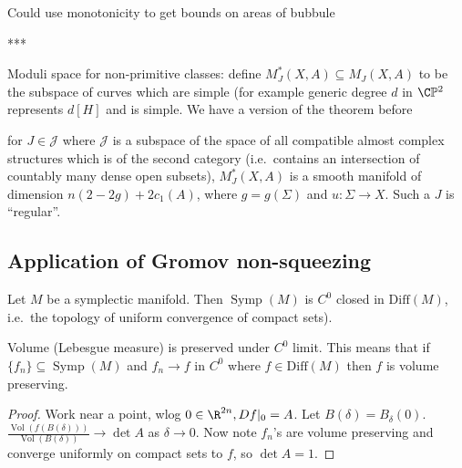 \documentclass[a4paper]{article}
\renewcommand*{\P}{\mathbb{P}}
\DeclareMathOperator{\Vol}{Vol} %
\DeclareMathOperator{\Symp}{Symp}
\begin{document}
Could use monotonicity to get bounds on areas of bubbule

***

Moduli space for non-primitive classes: define \(M_J^*(X, A) \subseteq M_J(X, A)\) to be the subspace of curves which are simple (for example generic degree \(d\) in \(\C\P^2\) represents \(d[H]\) and is simple. We have a version of the theorem before

\begin{theorem}
  for \(J \in \mathcal J\) where \(\mathcal J\) is a subspace of the space of all compatible almost complex structures which is of the second category (i.e.\ contains an intersection of countably many dense open subsets), \(M_J^*(X, A)\) is a smooth manifold of dimension \(n(2 - 2g) + 2c_1(A)\), where \(g = g(\Sigma)\) and \(u: \Sigma \to X\). Such a \(J\) is ``regular''.
\end{theorem}

\subsection{Application of Gromov non-squeezing}

\begin{theorem}[Eliashberg]\label{thm:Elaishberg theorem about C0 closure of Symp}
  Let \(M\) be a symplectic manifold. Then \(\Symp(M)\) is \(C^0\) closed in \(\mathrm{Diff}(M)\), i.e.\ the topology of uniform convergence of compact sets).
\end{theorem}

\begin{lemma}
  Volume (Lebesgue measure) is preserved under \(C^0\) limit. This means that if \(\{f_n\} \subseteq \Symp(M)\) and \(f_n \to f\) in \(C^0\) where \(f \in \mathrm{Diff}(M)\) then \(f\) is volume preserving.
\end{lemma}

\begin{proof}
  Work near a point, wlog \(0 \in \R^{2n}, Df|_0 = A\). Let \(B(\delta) = B_\delta(0)\). \(\frac{\Vol(f(B(\delta)))}{\Vol(B(\delta))} \to \det A\) as \(\delta \to 0\). Now note \(f_n\)'s are volume preserving and converge uniformly on compact sets to \(f\), so \(\det A = 1\).
\end{proof}
\end{document}
